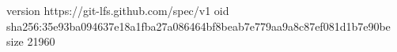 version https://git-lfs.github.com/spec/v1
oid sha256:35e93ba094637e18a1fba27a086464bf8beab7e779aa9a8c87ef081d1b7e90be
size 21960

